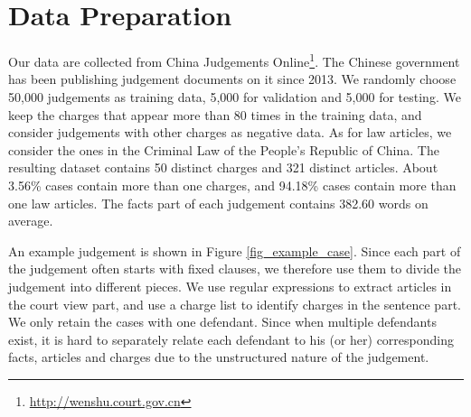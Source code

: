 \section{Data Preparation} 
Our data are collected from China Judgements Online\footnote{\url{http://wenshu.court.gov.cn}}. The Chinese government has been publishing judgement documents on it since 2013.
We randomly choose 50,000 judgements as training data, 5,000 for validation and 5,000 for testing. We keep the charges that appear more than 80 times in the training data, and consider judgements with other charges as negative data. As for law articles, we consider the ones in the Criminal Law of the People's Republic of China. The resulting dataset contains 50 distinct charges and 321 distinct articles. About 3.56\% cases contain more than one charges, and 94.18\% cases contain more than one law articles. 
The facts part of each judgement contains 382.60 words on average.

An example judgement is shown in Figure \ref{fig_example_case}. Since each part of the judgement often starts with fixed clauses, we therefore use them to divide the judgement into different pieces. 
We use regular expressions to extract articles in the court view part, and use a charge list to identify charges in the sentence part.
We only retain the cases with one defendant. Since when multiple defendants exist, it is hard to separately relate each defendant to his (or her) corresponding facts, articles and charges due to the unstructured nature of the judgement.





